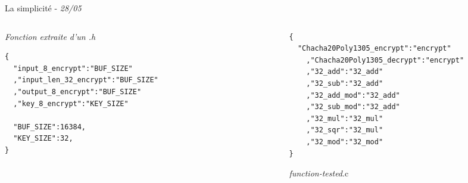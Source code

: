 \documentclass[A4,svgnames,9pt,aspectratio=169]{beamer}
\begin{document}
\begin{frame}[fragile]{La simplicité - \textit{28/05}}

  \begin{columns}
    \begin{column}{0.4\textwidth}
        \textit{Fonction extraite d'un .h}
      \vspace{1cm} 
      \begin{lstlisting}[style=CStyle, caption={matching.json}]
{
  "input_8_encrypt":"BUF_SIZE"
  ,"input_len_32_encrypt":"BUF_SIZE"
  ,"output_8_encrypt":"BUF_SIZE"
  ,"key_8_encrypt":"KEY_SIZE"

  "BUF_SIZE":16384,
  "KEY_SIZE":32,
}
      \end{lstlisting}
    \end{column}
    \begin{column}{0.1\textwidth}
      
    \end{column}


    \begin{column}{0.5\textwidth}

      \begin{lstlisting}[style=CStyle, caption={twin.json}]
{
  "Chacha20Poly1305_encrypt":"encrypt"
    ,"Chacha20Poly1305_decrypt":"encrypt"
    ,"32_add":"32_add"
    ,"32_sub":"32_add"
    ,"32_add_mod":"32_add"
    ,"32_sub_mod":"32_add"
    ,"32_mul":"32_mul"
    ,"32_sqr":"32_mul"
    ,"32_mod":"32_mod"
}
      \end{lstlisting}
      \vspace{1cm}
      \large{\textit{function-tested}.c}
    \end{column}
  \end{columns}
\end{frame}
\end{document}
